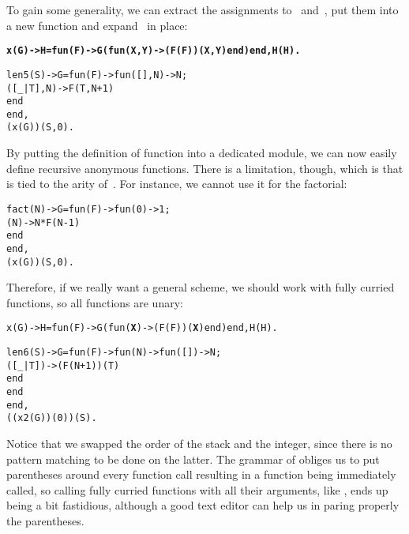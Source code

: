 To gain some generality, we can extract the assignments to
~and~, put them into a new function
 and expand~ in place:
\begin{alltt}
\textbf{x(G) -> H=fun(F) -> G(fun(X,Y)->(F(F))(X,Y) end) end, H(H).}

len5(S) -> G = fun(F) -> fun(   [],N) -> N;
                            ([\_|T],N) -> F(T,N+1)
                         end
               end,
           (x(G))(S,0).
\end{alltt}
By putting the definition of function  into a dedicated
module, we can now easily define recursive anonymous functions. There
is a limitation, though, which is that  is tied to the
arity of~. For instance, we cannot use it for the
factorial:
\begin{alltt}
fact(N) -> G = fun(F) -> fun(0) -> 1;
                            (N) -> N * F(N-1)
                         end
               end,
           (x(G))(S,0).\hfill% \emph{Arity mismatch}
\end{alltt}
Therefore, if we really want a general scheme, we should work with
fully curried functions, so all functions are unary:
\begin{alltt}
x(G) -> H = fun(F) -> G(fun(\textbf{X}) -> (F(F))(\textbf{X}) end) end, H(H).

len6(S) -> G=fun(F) -> fun(N) -> fun(   []) -> N;
                                    ([\_|T]) -> (F(N+1))(T)
                                 end
                       end
             end,
           ((x2(G))(0))(S).
\end{alltt}
Notice that we swapped the order of the stack and the integer, since
there is no pattern matching to be done on the latter. The grammar of
\Erlang obliges us to put parentheses around every function call
resulting in a function being immediately called, so calling fully
curried functions with all their arguments, like
, ends up being a bit fastidious, although a
good text editor can help us in paring properly the parentheses.

